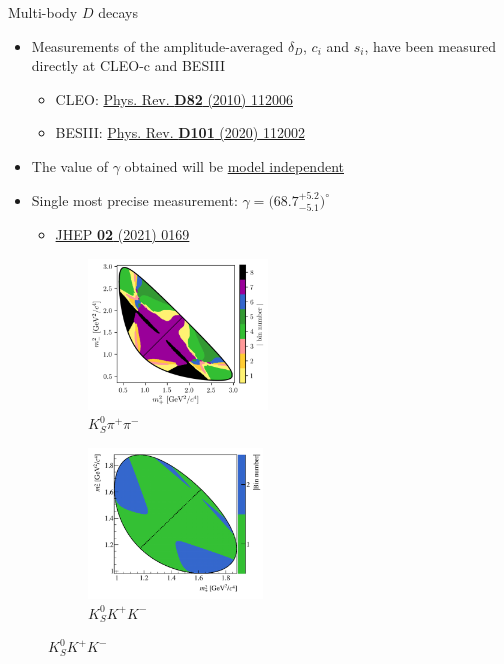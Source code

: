 \documentclass{beamer}
\begin{document}
\begin{frame}{Multi-body $D$ decays}
  \begin{itemize}
    \setlength\itemsep{0.5em}
    \item{Measurements of the amplitude-averaged $\delta_D$, $c_i$ and $s_i$, have been measured directly at CLEO-c and BESIII}
    \begin{itemize}
      \item{CLEO: \href{https://doi.org/10.1103/PhysRevD.82.112006}{Phys. Rev. \textbf{D82} (2010) 112006}}
      \item{BESIII: \href{https://journals.aps.org/prd/abstract/10.1103/PhysRevD.101.112002}{Phys. Rev. \textbf{D101} (2020) 112002}}
    \end{itemize}
    \item{The value of $\gamma$ obtained will be \underline{model independent}}
    \item{Single most precise measurement: $\gamma = \big(68.7^{+5.2}_{-5.1}\big)^\circ$}
    \begin{itemize}
      \item{\href{https://link.springer.com/article/10.1007/JHEP02(2021)169}{JHEP \textbf{02} (2021) 0169}}
    \end{itemize}
  \end{itemize}
  \begin{figure}
    \begin{subfigure}{0.45\textwidth}
      \includegraphics[height = 4.0cm]{Plots/KsPiPi_optimal.png}
      \vspace{-0.3cm}
      \caption*{$K_S^0\pi^+\pi^-$}
    \end{subfigure}%
    \begin{subfigure}{0.45\textwidth}
      \includegraphics[height = 4.0cm]{Plots/KsKK_binning.png}
      \vspace{-0.3cm}
      \caption*{$K_S^0K^+K^-$}
    \end{subfigure}
  \end{figure}
\end{frame}
\end{document}
